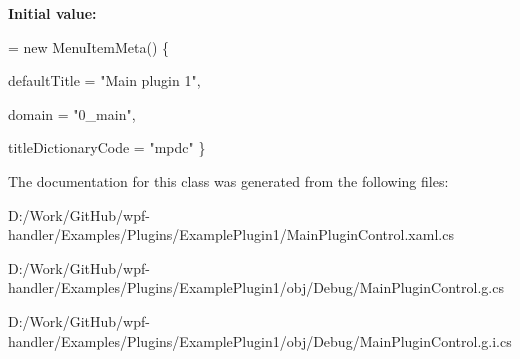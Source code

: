{\bfseries Initial value\+:}
\begin{DoxyCode}
= \textcolor{keyword}{new} MenuItemMeta()
        \{
            
            defaultTitle = \textcolor{stringliteral}{"Main plugin 1"},

            
            domain = \textcolor{stringliteral}{"0\_main"},

            
            titleDictionaryCode = \textcolor{stringliteral}{"mpdc"}
        \}
\end{DoxyCode}


The documentation for this class was generated from the following files\+:\begin{DoxyCompactItemize}
\item 
D\+:/\+Work/\+Git\+Hub/wpf-\/handler/\+Examples/\+Plugins/\+Example\+Plugin1/Main\+Plugin\+Control.\+xaml.\+cs\item 
D\+:/\+Work/\+Git\+Hub/wpf-\/handler/\+Examples/\+Plugins/\+Example\+Plugin1/obj/\+Debug/Main\+Plugin\+Control.\+g.\+cs\item 
D\+:/\+Work/\+Git\+Hub/wpf-\/handler/\+Examples/\+Plugins/\+Example\+Plugin1/obj/\+Debug/Main\+Plugin\+Control.\+g.\+i.\+cs\end{DoxyCompactItemize}

